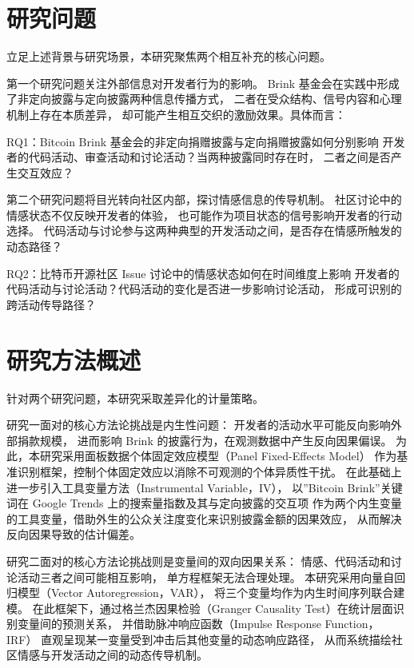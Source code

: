 \section{研究问题}

立足上述背景与研究场景，本研究聚焦两个相互补充的核心问题。

第一个研究问题关注外部信息对开发者行为的影响。
Brink 基金会在实践中形成了非定向披露与定向披露两种信息传播方式，
二者在受众结构、信号内容和心理机制上存在本质差异，
却可能产生相互交织的激励效果。具体而言：

RQ1：Bitcoin Brink 基金会的非定向捐赠披露与定向捐赠披露如何分别影响
开发者的代码活动、审查活动和讨论活动？当两种披露同时存在时，
二者之间是否产生交互效应？

第二个研究问题将目光转向社区内部，探讨情感信息的传导机制。
社区讨论中的情感状态不仅反映开发者的体验，
也可能作为项目状态的信号影响开发者的行动选择。
代码活动与讨论参与这两种典型的开发活动之间，是否存在情感所触发的动态路径？

RQ2：比特币开源社区 Issue 讨论中的情感状态如何在时间维度上影响
开发者的代码活动与讨论活动？代码活动的变化是否进一步影响讨论活动，
形成可识别的跨活动传导路径？

\section{研究方法概述}

针对两个研究问题，本研究采取差异化的计量策略。

研究一面对的核心方法论挑战是内生性问题：
开发者的活动水平可能反向影响外部捐款规模，
进而影响 Brink 的披露行为，在观测数据中产生反向因果偏误。
为此，本研究采用面板数据个体固定效应模型（Panel Fixed-Effects Model）
作为基准识别框架，控制个体固定效应以消除不可观测的个体异质性干扰。
在此基础上进一步引入工具变量方法（Instrumental Variable，IV），
以”Bitcoin Brink”关键词在 Google Trends 上的搜索量指数及其与定向披露的交互项
作为两个内生变量的工具变量，借助外生的公众关注度变化来识别披露金额的因果效应，
从而解决反向因果导致的估计偏差。

研究二面对的核心方法论挑战则是变量间的双向因果关系：
情感、代码活动和讨论活动三者之间可能相互影响，
单方程框架无法合理处理。
本研究采用向量自回归模型（Vector Autoregression，VAR），
将三个变量均作为内生时间序列联合建模。
在此框架下，通过格兰杰因果检验（Granger Causality Test）在统计层面识别变量间的预测关系，
并借助脉冲响应函数（Impulse Response Function，IRF）
直观呈现某一变量受到冲击后其他变量的动态响应路径，
从而系统描绘社区情感与开发活动之间的动态传导机制。

